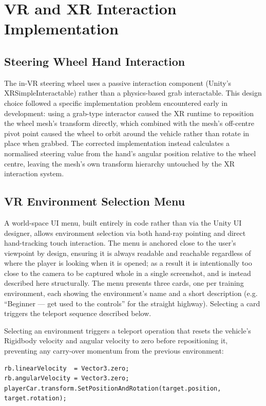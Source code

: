 \section{VR and XR Interaction Implementation}

\subsection{Steering Wheel Hand Interaction}
The in-VR steering wheel uses a passive interaction component (Unity's XRSimpleInteractable) rather than a physics-based grab interactable. This design choice followed a specific implementation problem encountered early in development: using a grab-type interactor caused the XR runtime to reposition the wheel mesh's transform directly, which combined with the mesh's off-centre pivot point caused the wheel to orbit around the vehicle rather than rotate in place when grabbed. The corrected implementation instead calculates a normalised steering value from the hand's angular position relative to the wheel centre, leaving the mesh's own transform hierarchy untouched by the XR interaction system.

\subsection{VR Environment Selection Menu}
A world-space UI menu, built entirely in code rather than via the Unity UI designer, allows environment selection via both hand-ray pointing and direct hand-tracking touch interaction. The menu is anchored close to the user's viewpoint by design, ensuring it is always readable and reachable regardless of where the player is looking when it is opened; as a result it is intentionally too close to the camera to be captured whole in a single screenshot, and is instead described here structurally. The menu presents three cards, one per training environment, each showing the environment's name and a short description (e.g. ``Beginner — get used to the controls'' for the straight highway). Selecting a card triggers the teleport sequence described below.

Selecting an environment triggers a teleport operation that resets the vehicle's Rigidbody velocity and angular velocity to zero before repositioning it, preventing any carry-over momentum from the previous environment:

\begin{verbatim}
rb.linearVelocity  = Vector3.zero;
rb.angularVelocity = Vector3.zero;
playerCar.transform.SetPositionAndRotation(target.position, target.rotation);
\end{verbatim}

